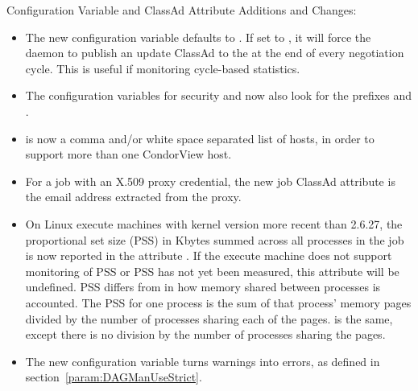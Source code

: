 \noindent Configuration Variable and ClassAd Attribute Additions and Changes:

\begin{itemize}

\item The new configuration variable 
defaults to .
If set to , it will force the  daemon
to publish an update ClassAd to the  at the end of 
every negotiation cycle. 
This is useful if monitoring cycle-based statistics.

\item The configuration variables for security 
 and 
now also look for the prefixes  and .
 
\item {} is now a comma and/or white space separated
list of hosts, in order to support more than one CondorView host.

\item For a job with an X.509 proxy credential, the new job ClassAd
attribute  is the email address extracted
from the proxy.

\item On Linux execute machines with kernel version more recent than 2.6.27,
the proportional set size (PSS) in Kbytes summed across all
processes in the job is now reported in the attribute
.  If the execute machine does not
support monitoring of PSS or PSS has not yet been measured, this
attribute will be undefined.  PSS differs from  in
how memory shared between processes is accounted.  The PSS for one
process is the sum of that process' memory pages divided by the
number of processes sharing each of the pages.   is
the same, except there is no division by the number of processes
sharing the pages.

\item The new configuration variable  
turns warnings into errors, as defined in section~\ref{param:DAGManUseStrict}.


\end{itemize}
